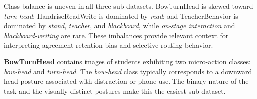 \documentclass{ieeeaccess}
\begin{document}
\begin{table}[!ht]
\caption{Overview of the three SCB sub-datasets used in this study,
including per-class bounding-box counts.
Class imbalance interacts with agreement filtering and anchor-aware routing
(Sec.~\ref{sec:discussion}).}
\label{tab:datasets}
\centering
{}
\end{table}

Class balance is uneven in all three sub-datasets.
BowTurnHead is skewed toward \textit{turn-head}; HandriseReadWrite is
dominated by \textit{read}; and TeacherBehavior is dominated by
\textit{stand}, \textit{teacher}, and \textit{blackboard}, while
\textit{on-stage interaction} and \textit{blackboard-writing} are rare.
These imbalances provide relevant context for interpreting agreement
retention bias and selective-routing behavior.

\textbf{BowTurnHead} contains images of students exhibiting two
micro-action classes: \textit{bow-head} and \textit{turn-head}.
The \textit{bow-head} class typically corresponds to a downward head
posture associated with distraction or phone use.
The binary nature of the task and the visually distinct postures make
this the easiest sub-dataset.
\end{document}
